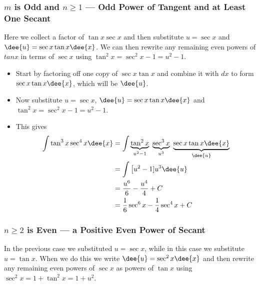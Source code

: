 \subsubsection*{$m$ is Odd and $n\geq 1$ --- Odd Power of Tangent and at Least One Secant}
Here we collect a factor of $\tan x \sec x$ and then substitute $u = \sec x$ and $\dee{u}
= \sec x \tan x \dee{x}$. We can then rewrite any remaining even powers of $tan
x$ in terms of $\sec x$ using $\tan^2x = \sec^2 x-1=u^2-1$.
\begin{eg}\label{eg:TRGINTf}
\soln
\begin{itemize}
 \item Start by factoring off one copy of $\sec x\tan x$ and combine it
with $dx$ to form $\sec x\tan x\dee{x}$, which will be $\dee{u}$.
\item Now substitute $u=\sec x$,
$\dee{u}=\sec x\tan x\dee{x}$ and $\tan^2x = \sec^2 x-1=u^2-1$.
\item This gives
\begin{align*}
\int \tan^3x \sec^4 x\dee{x}
&= \int \underbrace{\tan^2 x}_{u^2-1}\
        \underbrace{\sec^3 x}_{u^3}\
        \underbrace{\sec x\tan x\dee{x}}_{\dee{u}}  \\
&= \int \big[u^2-1]u^3\dee{u} \\
&=\frac{u^6}{6}-\frac{u^4}{4}+C \\
&=\frac{1}{6}\sec^6 x-\frac{1}{4}\sec^4 x + C
\end{align*}
\end{itemize}

\end{eg}

\subsubsection*{$n\geq 2$ is Even --- a Positive Even Power of Secant}
In the previous case we substituted $u = \sec x$, while in this case we substitute
$u=\tan x$. When we do this we write $\dee{u}=\sec^2 x \dee{x}$ and then rewrite
any remaining even powers of $\sec x$ as powers of $\tan x$ using $\sec^2x =
1+\tan^2x=1+u^2$.

